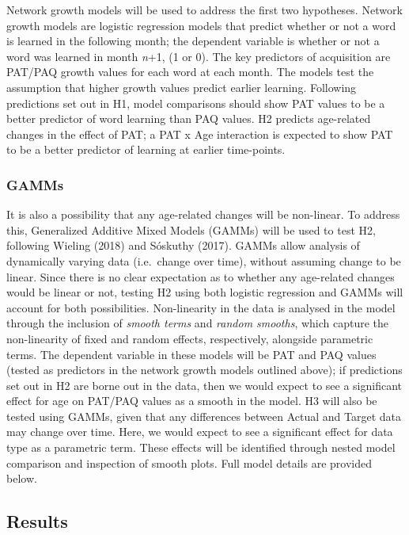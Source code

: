 \documentclass[
  man,mask,floatsintext]{apa6}
\begin{document}
Network growth models will be used to address the first two hypotheses. Network growth models are logistic regression models that predict whether or not a word is learned in the following month; the dependent variable is whether or not a word was learned in month \emph{n}+1, (1 or 0). The key predictors of acquisition are PAT/PAQ growth values for each word at each month. The models test the assumption that higher growth values predict earlier learning. Following predictions set out in H1, model comparisons should show PAT values to be a better predictor of word learning than PAQ values. H2 predicts age-related changes in the effect of PAT; a PAT x Age interaction is expected to show PAT to be a better predictor of learning at earlier time-points.

\hypertarget{gamms}{%
\subsubsection{GAMMs}\label{gamms}}

It is also a possibility that any age-related changes will be non-linear. To address this, Generalized Additive Mixed Models (GAMMs) will be used to test H2, following Wieling (2018) and Sóskuthy (2017). GAMMs allow analysis of dynamically varying data (i.e.~change over time), without assuming change to be linear. Since there is no clear expectation as to whether any age-related changes would be linear or not, testing H2 using both logistic regression and GAMMs will account for both possibilities. Non-linearity in the data is analysed in the model through the inclusion of \emph{smooth terms} and \emph{random smooths}, which capture the non-linearity of fixed and random effects, respectively, alongside parametric terms. The dependent variable in these models will be PAT and PAQ values (tested as predictors in the network growth models outlined above); if predictions set out in H2 are borne out in the data, then we would expect to see a significant effect for age on PAT/PAQ values as a smooth in the model. H3 will also be tested using GAMMs, given that any differences between Actual and Target data may change over time. Here, we would expect to see a significant effect for data type as a parametric term. These effects will be identified through nested model comparison and inspection of smooth plots. Full model details are provided below.

\hypertarget{results}{%
\subsection{Results}\label{results}}
\end{document}
